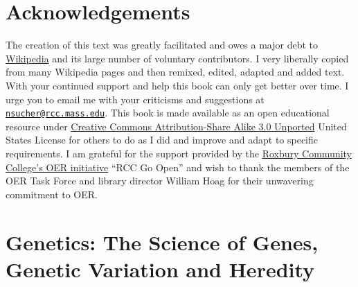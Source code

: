 ﻿




\frontmatter

\setcounter{page}{-1}


\maketitle

\setcounter{tocdepth}{1}
\tableofcontents

\clearpage

\listoffigures
\listoftables


\hypertarget{acknowledgements}{%
\chapter*{Acknowledgements}\label{acknowledgements}}

The creation of this text was greatly facilitated and owes a major debt to \href{https://www.wikipedia.org}{Wikipedia} and its large number of voluntary contributors. I very liberally copied from many Wikipedia pages and then remixed, edited, adapted and added text. With your continued support and help this book can only get better over time. I urge you to email me with your criticisms and suggestions at \href{mailto:nsucher@rcc.mass.edu}{\nolinkurl{nsucher@rcc.mass.edu}}. This book is made available as an open educational resource under \href{https://creativecommons.org/licenses/by-sa/3.0/deed.en}{Creative Commons Attribution-Share Alike 3.0 Unported} United States License for others to do as I did and improve and adapt to specific requirements. I am grateful for the support provided by the \href{http://libguides.rcc.mass.edu/OER/proposal}{Roxbury Community College's OER initiative} ``RCC Go Open'' and wish to thank the members of the OER Task Force and library director William Hoag for their unwavering commitment to OER.

\mainmatter

\hypertarget{genetics-the-science-of-genes-genetic-variation-and-heredity}{%
\chapter{Genetics: The Science of Genes, Genetic Variation and Heredity}\label{genetics-the-science-of-genes-genetic-variation-and-heredity}}

